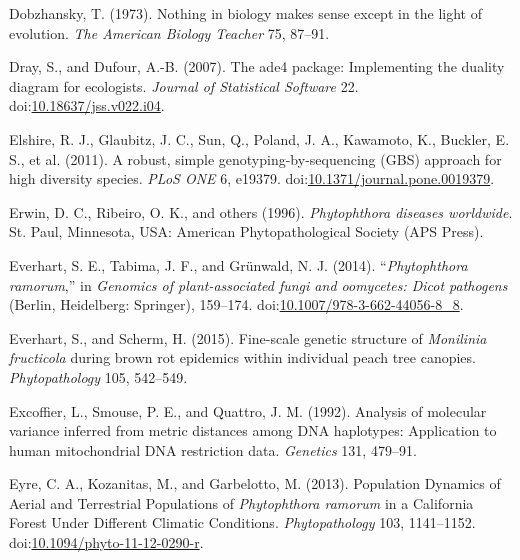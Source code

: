 \documentclass[double,12pt]{beavtex}
\begin{document}
  \hypertarget{ref-dobzhansky2013nothing}{}
  Dobzhansky, T. (1973). Nothing in biology makes sense except in the
  light of evolution. \emph{The American Biology Teacher} 75, 87--91.
  
  \hypertarget{ref-dray2007ade4}{}
  Dray, S., and Dufour, A.-B. (2007). The ade4 package: Implementing the
  duality diagram for ecologists. \emph{Journal of Statistical Software}
  22.
  doi:\href{https://doi.org/10.18637/jss.v022.i04}{10.18637/jss.v022.i04}.
  
  \hypertarget{ref-elshire2011robust}{}
  Elshire, R. J., Glaubitz, J. C., Sun, Q., Poland, J. A., Kawamoto, K.,
  Buckler, E. S., et al. (2011). A robust, simple genotyping-by-sequencing
  (GBS) approach for high diversity species. \emph{PLoS ONE} 6, e19379.
  doi:\href{https://doi.org/10.1371/journal.pone.0019379}{10.1371/journal.pone.0019379}.
  
  \hypertarget{ref-erwin1996phytophthora}{}
  Erwin, D. C., Ribeiro, O. K., and others (1996). \emph{Phytophthora
  diseases worldwide}. St. Paul, Minnesota, USA: American
  Phytopathological Society (APS Press).
  
  \hypertarget{ref-everhart2014phytophthora}{}
  Everhart, S. E., Tabima, J. F., and Grünwald, N. J. (2014).
  ``\emph{Phytophthora ramorum},'' in \emph{Genomics of plant-associated
  fungi and oomycetes: Dicot pathogens} (Berlin, Heidelberg: Springer),
  159--174.
  doi:\href{https://doi.org/10.1007/978-3-662-44056-8_8}{10.1007/978-3-662-44056-8\_8}.
  
  \hypertarget{ref-everhart2014fine}{}
  Everhart, S., and Scherm, H. (2015). Fine-scale genetic structure of
  \emph{Monilinia fructicola} during brown rot epidemics within individual
  peach tree canopies. \emph{Phytopathology} 105, 542--549.
  
  \hypertarget{ref-excoffier1992analysis}{}
  Excoffier, L., Smouse, P. E., and Quattro, J. M. (1992). Analysis of
  molecular variance inferred from metric distances among DNA haplotypes:
  Application to human mitochondrial DNA restriction data. \emph{Genetics}
  131, 479--91.
  
  \hypertarget{ref-eyre2013poulation}{}
  Eyre, C. A., Kozanitas, M., and Garbelotto, M. (2013). Population
  Dynamics of Aerial and Terrestrial Populations of \emph{Phytophthora
  ramorum} in a California Forest Under Different Climatic Conditions.
  \emph{Phytopathology} 103, 1141--1152.
  doi:\href{https://doi.org/10.1094/phyto-11-12-0290-r}{10.1094/phyto-11-12-0290-r}.
  
\end{document}
